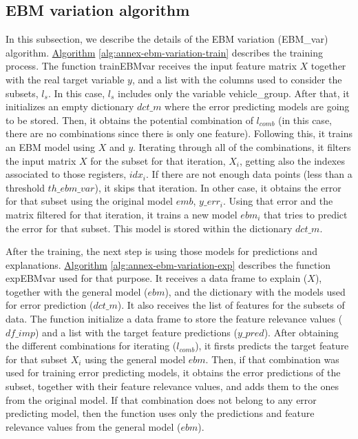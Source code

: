 \subsection{EBM variation algorithm}\label{subsec:annex-ebm-var}
In this subsection, we describe the details of the EBM variation (EBM\_var) algorithm.
\hyperref[alg:annex-ebm-variation-train]{Algorithm} \ref{alg:annex-ebm-variation-train} describes the training process. The function trainEBMvar receives the input feature matrix $X$ together with the real target variable $y$, and a list with the columns used to consider the subsets, $l_s$. In this case, $l_s$ includes only the variable vehicle\_group. After that, it initializes an empty dictionary $dct\_m$ where the error predicting models are going to be stored. Then, it obtains the potential combination of $l_{comb}$ (in this case, there are no combinations since there is only one feature). Following this, it trains an EBM model using $X$ and $y$.
Iterating through all of the combinations, it filters the input matrix $X$ for the subset for that iteration, $X_i$, getting also the indexes associated to those registers, $idx_i$. If there are not enough data points (less than a threshold $th\_ebm\_var$), it skips that iteration. In other case, it obtains the error for that subset using the original model $emb$, $y\_err_i$. Using that error and the matrix filtered for that iteration, it trains a new model $ebm_i$ that tries to predict the error for that subset. This model is stored within the dictionary $dct\_m$.

After the training, the next step is using those models for predictions and explanations.
\hyperref[alg:annex-ebm-variation-exp]{Algorithm} \ref{alg:annex-ebm-variation-exp} describes the function expEBMvar used for that purpose. It receives a data frame to explain ($X$), together with the general model ($ebm$), and the dictionary with the models used for error prediction ($dct\_m$). It also receives the list of features for the subsets of data.
The function initialize a data frame to store the feature relevance values ($df\_imp$) and a list with the target feature predictions ($y\_pred$). After obtaining the different combinations for iterating ($l_{comb}$), it firsts predicts the target feature for that subset $X_i$ using the general model $ebm$. Then, if that combination was used for training error predicting models, it obtains the error predictions of the subset, together with their feature relevance values, and adds them to the ones from the original model. If that combination does not belong to any error predicting model, then the function uses only the predictions and feature relevance values from the general model ($ebm$).

